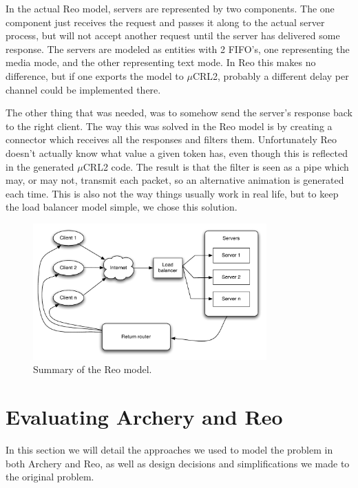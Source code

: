 \documentclass[a4paper]{article}
\newcommand{\ar}{Archery\xspace}
\newcommand{\re}{Reo\xspace}
\newcommand{\mcrl}{$\mu$CRL2\xspace}
\begin{document}
In the actual \re model, servers are represented by two components. The one
component just receives the request and passes it along to the actual server
process, but will not accept another request until the server has delivered some
response. The servers are modeled as entities with 2 FIFO's, one representing
the media mode, and the other representing text mode. In \re this makes no
difference, but if one exports the model to \mcrl, probably a different delay
per channel could be
implemented there. 

The other thing that was needed, was to somehow send the server's response back
to the right client. The way this was solved in the \re model is by creating a
connector which receives all the responses and filters them. Unfortunately \re
doesn't actually know what value a given token has, even though this is
reflected in the generated \mcrl code. The result is that the filter is seen as
a pipe which may, or may not, transmit each packet, so an alternative animation
is generated each time. This is also not the way things usually work in real
life, but to keep the load balancer model simple, we chose this solution.

\begin{figure}[h]
    \begin{center}
        \includegraphics[width=0.8\textwidth]{images/reo-model.pdf}
    \end{center}
    \caption{Summary of the \re model.}
    \label{fig:reo}
\end{figure}

%
%
\section{Evaluating \ar and \re}

In this section we will detail the approaches we used to model the problem in
both \ar and \re, as well as design decisions and simplifications we made to the
original problem.
\end{document}
